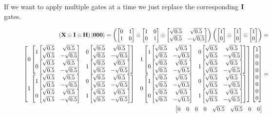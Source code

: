 \newpage
\noindent
If we want to apply multiple gates at a time we just replace the corresponding $\qti$ gates. 
\begin{figure}[H]
    \centering
    \begin{align*}
        \left(\qtx\otimes\qti\otimes\qth\right)\ket{\qtz\qtz\qtz}=\left(\qx\otimes\qi\otimes\qh\right)\left(\qz\otimes\qz\otimes\qz\right)&= \\
        \begin{bmatrix}
            0
            \begin{bmatrix}
                1 \qh & 0 \qh\\
                0 \qh & 1 \qh\\
            \end{bmatrix}
            & 1
            \begin{bmatrix}
                1 \qh & 0 \qh\\
                0 \qh & 1 \qh\\
            \end{bmatrix}\\
            1 
            \begin{bmatrix}
                1 \qh & 0 \qh\\
                0 \qh & 1 \qh\\
            \end{bmatrix}
            & 0
            \begin{bmatrix}
                1 \qh & 0 \qh\\
                0 \qh & 1 \qh\\
            \end{bmatrix}\\ 
        \end{bmatrix}
        \begin{bmatrix}
            1\\
            0\\
            0\\
            0\\
            0\\
            0\\
            0\\
            0
        \end{bmatrix}
        &=\\
        \begin{bmatrix}
        0           &  0          &   0          &   0          &   \sqrt{0.5}      &          \sqrt{0.5} &   0          &   0         \\

\end{bmatrix}
\end{align*}
\end{figure}
